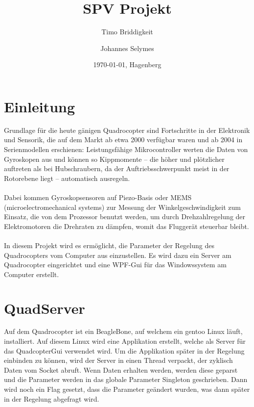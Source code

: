 \documentclass[]{scrartcl}
\title{SPV Projekt}
\author{Timo Briddigkeit \and Johannes Selymes}
\date{\today{}, Hagenberg}
\begin{document}
\maketitle
\newpage
\tableofcontents
\newpage




\section{Einleitung}
Grundlage für die heute gänigen Quadrocopter sind Fortschritte in der Elektronik und Sensorik, die auf dem Markt ab etwa 2000 verfügbar waren und ab 2004 in Serienmodellen erschienen: Leistungsfähige Mikrocontroller werten die Daten von Gyroskopen aus und können so Kippmomente – die höher und plötzlicher auftreten als bei Hubschraubern, da der Auftriebsschwerpunkt meist in der Rotorebene liegt – automatisch ausregeln.\\
\\
Dabei kommen Gyroskopsensoren auf Piezo-Basis oder MEMS (microelectromechanical systems) zur Messung der Winkelgeschwindigkeit zum Einsatz, die von dem Prozessor benutzt werden, um durch Drehzahlregelung der Elektromotoren die Drehraten zu dämpfen, womit das Fluggerät steuerbar bleibt.\\
\\
In diesem Projekt wird es ermöglicht, die Parameter der Regelung des Quadrocopters vom Computer aus einzustellen. Es wird dazu ein Server am Quadrocopter eingerichtet und eine WPF-Gui für das Windowssystem am Computer erstellt.

\newpage

\section{QuadServer}
Auf dem Quadrocopter ist ein BeagleBone, auf welchem ein gentoo Linux läuft, installiert. Auf diesem Linux wird eine Applikation erstellt, welche als Server für das QuadcopterGui verwendet wird. Um die Applikation später in der Regelung einbinden zu können, wird der Server in einen Thread verpackt, der zyklisch Daten vom Socket abruft. Wenn Daten erhalten werden, werden diese geparst und die Parameter werden in das globale Parameter Singleton geschrieben. Dann wird noch ein Flag gesetzt, dass die Parameter geändert wurden, was dann später in der Regelung abgefragt wird. 
\end{document}
